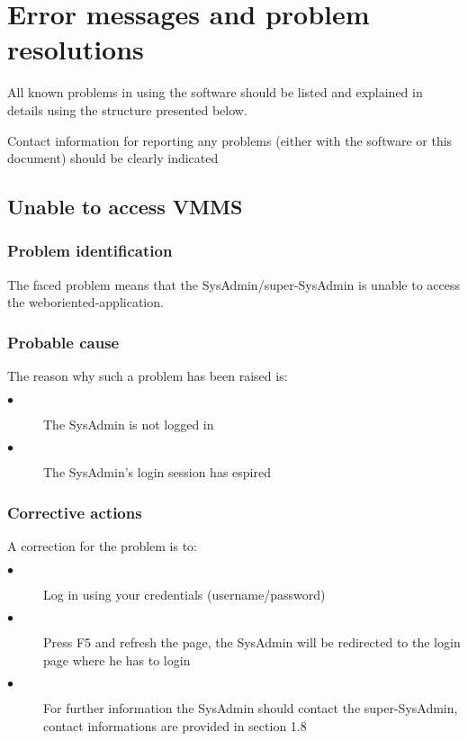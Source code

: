 
\chapter{Error messages and problem resolutions}
\label{chap:error_messages}

All known problems in using the software should be listed and explained in
details using the structure presented below.

Contact information for reporting any problems (either with the software or
this document) should be clearly indicated


\section{Unable to access VMMS} 

\subsection{Problem identification}
The faced problem means that the SysAdmin/super-SysAdmin is unable to access the weboriented-application.

\subsection{Probable cause}

The reason why such a problem has been raised is:\\
\begin{description}
 \item[$\bullet$] The SysAdmin is not logged in
 \item[$\bullet$] The SysAdmin's login session has espired
\end{description}


\subsection{Corrective actions}

A correction for the problem is to:\\
\begin{description}
\item[$\bullet$] Log in using your credentials (username/password)
\item[$\bullet$] Press F5 and refresh the page, the SysAdmin will be redirected
to the login page where he has to login
\item[$\bullet$] For further information the SysAdmin should contact the
super-SysAdmin, contact informations are provided in section 1.8
\end{description}







